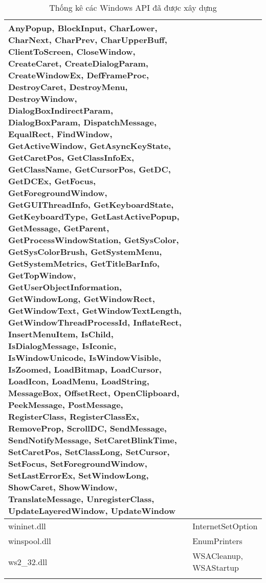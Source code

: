 \begin{longtable}[H]{ | m{3.5cm} | m{10cm} | }
AnyPopup, BlockInput, CharLower, CharNext, CharPrev, CharUpperBuff, ClientToScreen, CloseWindow, CreateCaret, CreateDialogParam, CreateWindowEx, DefFrameProc, DestroyCaret, DestroyMenu, DestroyWindow, DialogBoxIndirectParam, DialogBoxParam, DispatchMessage, EqualRect, FindWindow, GetActiveWindow, GetAsyncKeyState, GetCaretPos, GetClassInfoEx, GetClassName, GetCursorPos, GetDC, GetDCEx, GetFocus, GetForegroundWindow, GetGUIThreadInfo, GetKeyboardState, GetKeyboardType, GetLastActivePopup, GetMessage, GetParent, GetProcessWindowStation, GetSysColor, GetSysColorBrush, GetSystemMenu, GetSystemMetrics, GetTitleBarInfo, GetTopWindow, GetUserObjectInformation, GetWindowLong, GetWindowRect, GetWindowText, GetWindowTextLength, GetWindowThreadProcessId, InflateRect, InsertMenuItem, IsChild, IsDialogMessage, IsIconic, IsWindowUnicode, IsWindowVisible, IsZoomed, LoadBitmap, LoadCursor, LoadIcon, LoadMenu, LoadString, MessageBox, OffsetRect, OpenClipboard, PeekMessage, PostMessage, RegisterClass, RegisterClassEx, RemoveProp, ScrollDC, SendMessage, SendNotifyMessage, SetCaretBlinkTime, SetCaretPos, SetClassLong, SetCursor, SetFocus, SetForegroundWindow, SetLastErrorEx, SetWindowLong, ShowCaret, ShowWindow, TranslateMessage, UnregisterClass, UpdateLayeredWindow, UpdateWindow \\
\hline
wininet.dll &
InternetSetOption \\
\hline
winspool.dll &
EnumPrinters \\
\hline
ws2\_32.dll &
WSACleanup, WSAStartup \\

\hline
\caption{Thống kê các Windows API đã được xây dựng}
\label{table:tblWapiResult}
\end{longtable}